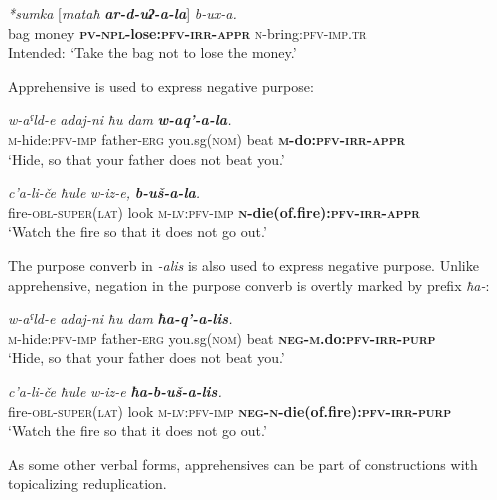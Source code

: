 ﻿\documentclass[output=paper]{langsci/langscibook}
\begin{document}
\ex %
\gll \emph{*sumka} [\emph{mataħ} \emph{\textbf{ar-d-uʔ-a-la}}] \emph{b-ux-a.}\\
 bag money \textbf{\textsc{pv}-\textsc{npl}-lose:\textsc{pfv}-\textsc{irr}-\textsc{appr}} \textsc{n}-bring:\textsc{pfv}-\textsc{imp}.\textsc{tr}\\
\glt Intended: `Take the bag not to lose the money.'
\z

Apprehensive is used to express negative purpose:

\ea %
\gll \emph{w-aˤld-e} \emph{adaj-ni} \emph{ħu} \emph{dam} \emph{\textbf{w-aq'-a-la}.}\\
 \textsc{m}-hide:\textsc{pfv}-\textsc{imp} father-\textsc{erg} you.sg(\textsc{nom}) beat \textbf{\textsc{m}-do:\textsc{pfv}}\textbf{-\textsc{irr}-\textsc{appr}}\\
\glt `Hide, so that your father does not beat you.'

\ex %
\gll \emph{c'a-li-če} \emph{ħule} \emph{w-iz-e,} \emph{\textbf{b-uš-a-la}.}\\
 fire-\textsc{obl}-\textsc{super}(\textsc{lat}) look \textsc{m}-\textsc{lv}:\textsc{pfv}-\textsc{imp} \textbf{\textsc{n}-die(of.fire):\textsc{pfv}-\textsc{irr}-\textsc{appr}}\\
\glt `Watch the fire so that it does not go out.'
\z

The purpose converb in \emph{-alis} is also used to express negative
purpose. Unlike apprehensive, negation in the purpose converb is overtly
marked by prefix \emph{ħa-}:

\ea %
\gll \emph{w-aˤld-e} \emph{adaj-ni} \emph{ħu} \emph{dam} \emph{\textbf{ħa-q'-a-lis}.}\\
 \textsc{m}-hide:\textsc{pfv}-\textsc{imp} father-\textsc{erg} you.sg(\textsc{nom}) beat \textbf{\textsc{neg}-\textsc{m}.do:\textsc{pfv}-\textsc{irr}-\textsc{purp}}\\
\glt `Hide, so that your father does not beat you.'

\ex %
\gll \emph{c'a-li-če} \emph{ħule} \emph{w-iz-e} \emph{\textbf{ħa-b-uš-a-lis}.}\\
 fire-\textsc{obl}-\textsc{super}(\textsc{lat}) look \textsc{m}-\textsc{lv}:\textsc{pfv}-\textsc{imp} \textbf{\textsc{neg}-\textsc{n}-die(of.fire):\textsc{pfv}-\textsc{irr}-\textsc{purp}}\\
\glt `Watch the fire so that it does not go out.'
\z

As some other verbal forms, apprehensives can be part of constructions
with topicalizing reduplication.
\end{document}
